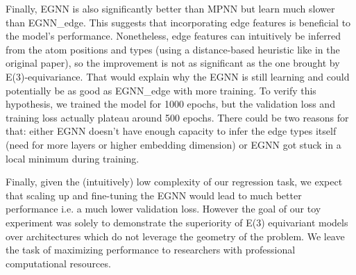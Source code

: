 \documentclass[sigconf]{acmart}
\begin{document}
Finally, EGNN is also significantly better than MPNN but learn much slower than EGNN\_edge. This suggests that incorporating edge features is beneficial to the model's performance.
Nonetheless, edge features can intuitively be inferred from the atom positions and types (using a distance-based heuristic like in the original paper), so the improvement is not as significant as the one brought by E(3)-equivariance.
That would explain why the EGNN is still learning and could potentially be as good as EGNN\_edge with more training. To verify this hypothesis, we trained the model for 1000 epochs, but the validation loss and training loss actually plateau around 500 epochs. There could be two reasons for that: either EGNN doesn't have enough capacity to infer the edge types itself (need for more layers or higher embedding dimension) or EGNN got stuck in a local minimum during training.

Finally, given the (intuitively) low complexity of our regression task, we expect that scaling up and fine-tuning the EGNN would lead to much better performance i.e. a much lower validation loss. However the goal of our toy experiment was solely to demonstrate the superiority of E(3) equivariant models over architectures which do not leverage the geometry of the problem. We leave the task of maximizing performance to researchers with professional computational resources.




\end{document}
